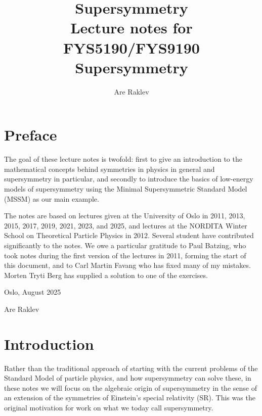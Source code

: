 \documentclass[11pt,a4paper]{book}
\title{{\Huge Supersymmetry} \\ 
\vspace{5mm} Lecture notes for FYS5190/FYS9190 Supersymmetry}
\author{Are Raklev}
\begin{document}

\maketitle


\chapter*{Preface}


The goal of these lecture notes is twofold: first to give an introduction to the mathematical concepts behind symmetries in physics in general and supersymmetry in particular, and secondly to introduce the basics of low-energy models of supersymmetry using the Minimal Supersymmetric Standard Model (MSSM) as our main example. 

The notes are based on lectures given at the University of Oslo in 2011, 2013, 2015, 2017, 2019, 2021, 2023, and 2025, and lectures at the NORDITA Winter School on Theoretical Particle Physics in 2012.  Several student have contributed significantly to the notes. We owe a particular gratitude to Paul Batzing, who took notes during the first version of the lectures in 2011, forming the start of this document, and to Carl Martin Favang who has fixed many of my mistakes. Morten Tryti Berg has supplied a solution to one of the exercises.


\vspace{5mm}
Oslo, August 2025

Are Raklev





\tableofcontents



\chapter*{Introduction}
Rather than the traditional approach of starting with the current problems of the Standard Model of particle physics, and how supersymmetry can solve these, in these notes we will focus on the algebraic origin of supersymmetry in the sense of an extension of the symmetries of Einstein's special relativity (SR). This was the original motivation for work on what we today call supersymmetry. 
\end{document}
